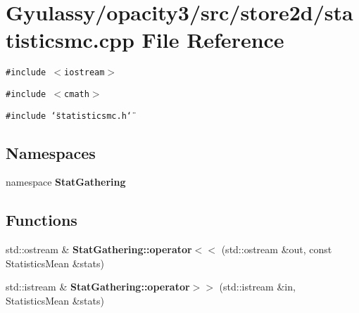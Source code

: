 \section{Gyulassy/opacity3/src/store2d/statisticsmc.cpp File Reference}
\label{statisticsmc_8cpp}
{\tt \#include $<$iostream$>$}\par
{\tt \#include $<$cmath$>$}\par
{\tt \#include \char`\"{}statisticsmc.h\char`\"{}}\par
\subsection*{Namespaces}
\begin{CompactItemize}
\item 
namespace {\bf StatGathering}
\end{CompactItemize}
\subsection*{Functions}
\begin{CompactItemize}
\item 
std::ostream \& {\bf StatGathering::operator$<$$<$} (std::ostream \&out, const StatisticsMean \&stats)
\item 
std::istream \& {\bf StatGathering::operator$>$$>$} (std::istream \&in, StatisticsMean \&stats)
\end{CompactItemize}
